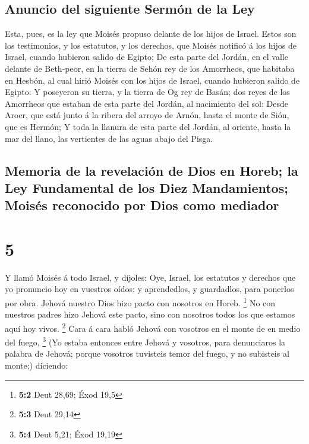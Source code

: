 \hypertarget{anuncio-del-siguiente-sermuxf3n-de-la-ley}{%
\subsection{Anuncio del siguiente Sermón de la
Ley}\label{anuncio-del-siguiente-sermuxf3n-de-la-ley}}

 Esta, pues, es la ley que Moisés propuso delante de los
hijos de Israel.  Estos son los testimonios, y los
estatutos, y los derechos, que Moisés notificó á los hijos de Israel,
cuando hubieron salido de Egipto;  De esta parte del
Jordán, en el valle delante de Beth-peor, en la tierra de Sehón rey de
los Amorrheos, que habitaba en Hesbón, al cual hirió Moisés con los
hijos de Israel, cuando hubieron salido de Egipto:  Y
poseyeron su tierra, y la tierra de Og rey de Basán; dos reyes de los
Amorrheos que estaban de esta parte del Jordán, al nacimiento del sol:
 Desde Aroer, que está junto á la ribera del arroyo de
Arnón, hasta el monte de Sión, que es Hermón;  Y toda la
llanura de esta parte del Jordán, al oriente, hasta la mar del llano,
las vertientes de las aguas abajo del Pisga.

\hypertarget{memoria-de-la-revelaciuxf3n-de-dios-en-horeb-la-ley-fundamental-de-los-diez-mandamientos-moisuxe9s-reconocido-por-dios-como-mediador}{%
\subsection{Memoria de la revelación de Dios en Horeb; la Ley
Fundamental de los Diez Mandamientos; Moisés reconocido por Dios como
mediador}\label{memoria-de-la-revelaciuxf3n-de-dios-en-horeb-la-ley-fundamental-de-los-diez-mandamientos-moisuxe9s-reconocido-por-dios-como-mediador}}

\hypertarget{section-4}{%
\section{5}\label{section-4}}

 Y llamó Moisés á todo Israel, y díjoles: Oye, Israel, los
estatutos y derechos que yo pronuncio hoy en vuestros oídos: y
aprendedlos, y guardadlos, para ponerlos por obra.  Jehová
nuestro Dios hizo pacto con nosotros en Horeb. \footnote{\textbf{5:2}
  Deut 28,69; Éxod 19,5}  No con nuestros padres hizo Jehová
este pacto, sino con nosotros todos los que estamos aquí hoy vivos.
\footnote{\textbf{5:3} Deut 29,14}  Cara á cara habló Jehová
con vosotros en el monte de en medio del fuego, \footnote{\textbf{5:4}
  Deut 5,21; Éxod 19,19}  (Yo estaba entonces entre Jehová y
vosotros, para denunciaros la palabra de Jehová; porque vosotros
tuvisteis temor del fuego, y no subisteis al monte;) diciendo:

